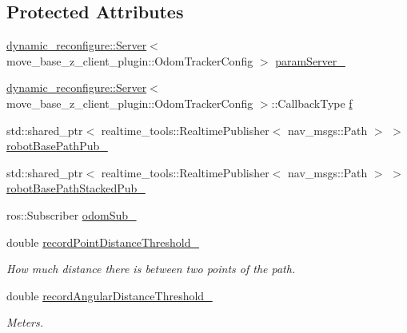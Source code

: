 \subsection*{Protected Attributes}
\begin{DoxyCompactItemize}
\item 
\hyperlink{sm__ridgeback__floor__coverage__static__1_2servers_2led__action__server_2src_2led__action__server__node_8cpp_a280552a59985eb5d9311dba701679363}{dynamic\+\_\+reconfigure\+::\+Server}$<$ move\+\_\+base\+\_\+z\+\_\+client\+\_\+plugin\+::\+Odom\+Tracker\+Config $>$ \hyperlink{classcl__move__base__z_1_1odom__tracker_1_1OdomTracker_a8bee0a1a49b5f736a7d7a741e56f7b02}{param\+Server\+\_\+}
\item 
\hyperlink{sm__ridgeback__floor__coverage__static__1_2servers_2led__action__server_2src_2led__action__server__node_8cpp_a280552a59985eb5d9311dba701679363}{dynamic\+\_\+reconfigure\+::\+Server}$<$ move\+\_\+base\+\_\+z\+\_\+client\+\_\+plugin\+::\+Odom\+Tracker\+Config $>$\+::Callback\+Type \hyperlink{classcl__move__base__z_1_1odom__tracker_1_1OdomTracker_a391e33cf5482697b32665fcc7c4d87e4}{f}
\item 
std\+::shared\+\_\+ptr$<$ realtime\+\_\+tools\+::\+Realtime\+Publisher$<$ nav\+\_\+msgs\+::\+Path $>$ $>$ \hyperlink{classcl__move__base__z_1_1odom__tracker_1_1OdomTracker_a40a7cbb6bb6595e250e7c685c781613b}{robot\+Base\+Path\+Pub\+\_\+}
\item 
std\+::shared\+\_\+ptr$<$ realtime\+\_\+tools\+::\+Realtime\+Publisher$<$ nav\+\_\+msgs\+::\+Path $>$ $>$ \hyperlink{classcl__move__base__z_1_1odom__tracker_1_1OdomTracker_a7a2fb23e835ba7d63e69c8db819be876}{robot\+Base\+Path\+Stacked\+Pub\+\_\+}
\item 
ros\+::\+Subscriber \hyperlink{classcl__move__base__z_1_1odom__tracker_1_1OdomTracker_ab55df0e91246e43dff80912dc35a4fee}{odom\+Sub\+\_\+}
\item 
double \hyperlink{classcl__move__base__z_1_1odom__tracker_1_1OdomTracker_a3a1173716d527bd182d04656491e01dd}{record\+Point\+Distance\+Threshold\+\_\+}
\begin{DoxyCompactList}\small\item\em How much distance there is between two points of the path. \end{DoxyCompactList}\item 
double \hyperlink{classcl__move__base__z_1_1odom__tracker_1_1OdomTracker_a1274fe5334c109cd9c2339beb9411441}{record\+Angular\+Distance\+Threshold\+\_\+}
\begin{DoxyCompactList}\small\item\em Meters. \end{DoxyCompactList}\item 

\end{DoxyCompactItemize}
